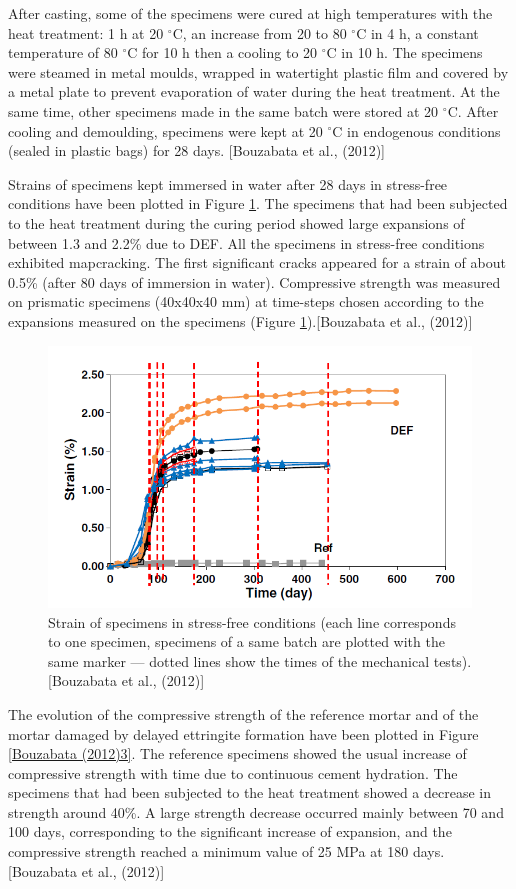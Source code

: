 After casting, some of the specimens were cured at high temperatures with the heat treatment: 1 h at 20 $^\circ$C, an increase from 20 to 80 $^\circ$C in 4 h, a constant temperature of 80 $^\circ$C for 10 h then a cooling to 20 $^\circ$C in 10 h. The specimens were steamed in metal moulds, wrapped in watertight plastic film and covered by a metal plate to prevent evaporation of water during the heat treatment. At the same time, other specimens made in the same batch were stored at 20 $^\circ$C. After cooling and demoulding, specimens were kept at 20 $^\circ$C in endogenous conditions (sealed in plastic bags) for 28 days. [Bouzabata et al., (2012)\cite{Bouzabata}]

Strains of specimens kept immersed in water after 28 days in stress-free conditions have been plotted in Figure \ref{Bouzabata (2012)2}. The specimens that had been subjected to the heat treatment during the curing period showed large expansions of between 1.3 and 2.2\% due to DEF. All the specimens in stress-free conditions exhibited mapcracking. The first significant cracks appeared for a strain of about 0.5\% (after 80 days of immersion in water). Compressive strength was measured on prismatic specimens (40x40x40 mm) at time-steps chosen according to the expansions measured on the specimens (Figure \ref{Bouzabata (2012)2}).[Bouzabata et al., (2012)\cite{Bouzabata}]

\begin{figure}[h!]
  \centering
  \includegraphics[width=0.8\linewidth]{Reference/Bouzabata2.png}
  \caption{Strain of specimens in stress-free conditions (each line corresponds to one specimen, specimens of a same batch are plotted with the same marker — dotted lines show the times of the mechanical tests). [Bouzabata et al., (2012)\cite{Bouzabata}]}
  \label{Bouzabata (2012)2}
\end{figure}

The evolution of the compressive strength of the reference mortar and of the mortar damaged by delayed ettringite formation have been plotted in Figure \ref{Bouzabata (2012)3}. The reference specimens showed the usual increase of compressive strength with time due to continuous cement hydration. The specimens that had been subjected to the heat treatment showed a decrease in strength around 40\%. A large strength decrease occurred mainly between 70 and 100 days, corresponding to the significant increase of expansion, and the compressive strength reached a minimum value of 25 MPa at 180 days.[Bouzabata et al., (2012)\cite{Bouzabata}]

